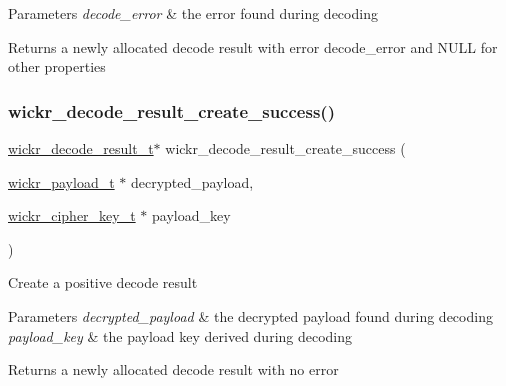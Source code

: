 \begin{DoxyParams}{Parameters}
{\em decode\+\_\+error} & the error found during decoding \\
\hline
\end{DoxyParams}
\begin{DoxyReturn}{Returns}
a newly allocated decode result with error \textquotesingle{}decode\+\_\+error\textquotesingle{} and N\+U\+LL for other properties 
\end{DoxyReturn}
\mbox{\label{group__wickr__protocol_ga633aaf4cb6159be0110401f06dae458c}} 
\subsubsection{\texorpdfstring{wickr\+\_\+decode\+\_\+result\+\_\+create\+\_\+success()}{wickr\_decode\_result\_create\_success()}}
{\footnotesize\ttfamily \hyperlink{structwickr__decode__result}{wickr\+\_\+decode\+\_\+result\+\_\+t}$\ast$ wickr\+\_\+decode\+\_\+result\+\_\+create\+\_\+success (\begin{DoxyParamCaption}\item[{\hyperlink{structwickr__payload}{wickr\+\_\+payload\+\_\+t} $\ast$}]{decrypted\+\_\+payload,  }\item[{\hyperlink{structwickr__cipher__key}{wickr\+\_\+cipher\+\_\+key\+\_\+t} $\ast$}]{payload\+\_\+key }\end{DoxyParamCaption})}

Create a positive decode result


\begin{DoxyParams}{Parameters}
{\em decrypted\+\_\+payload} & the decrypted payload found during decoding \\
\hline
{\em payload\+\_\+key} & the payload key derived during decoding \\
\hline
\end{DoxyParams}
\begin{DoxyReturn}{Returns}
a newly allocated decode result with no error 
\end{DoxyReturn}
\mbox{\label{group__wickr__protocol_ga94154ab44a6c2e9b97a115e37416efe1}} 
